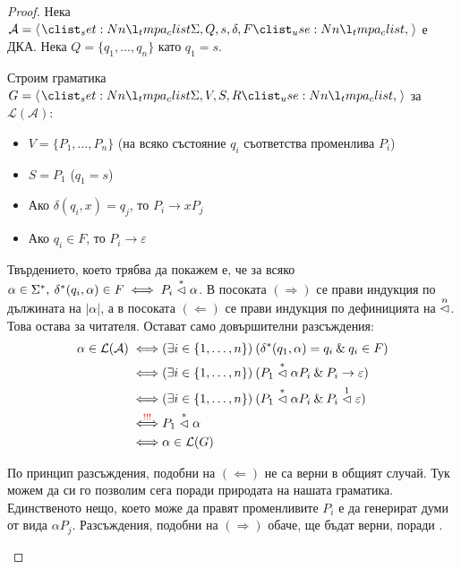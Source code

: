 \begin{proof}
    Нека $\mathcal{A} = \opair{\Sigma, Q, s, \delta, F}$ е ДКА.
    Нека $Q = \{ q_1, \dots, q_n \}$ като $q_1 = s$.

    Строим граматика $G = \opair{\Sigma, V, S, R}$ за $\mathcal{L(A)}$:
    \begin{itemize}
        \item $V = \{ P_1, \dots, P_n \}$ (на всяко състояние $q_i$ съответства променлива $P_i$)
        \item $S = P_1$ ($q_1 = s$)
        \item Ако $\delta(q_i, x) = q_j$, то $P_i \rightarrow x P_j$
        \item Ако $q_i \in F$, то $P_i \rightarrow \varepsilon$
    \end{itemize}

    Твърдението, което трябва да покажем е, че за всяко $\alpha \in \Sigma^*, \: \delta^*(q_i, \alpha) \in F \iff P_i \stackrel{*}{\vartriangleleft} \alpha $.
    В посоката $(\Rightarrow)$ се прави индукция по дължината на $|\alpha|$, а в посоката $(\Leftarrow)$ се прави индукция по дефиницията на $\stackrel{n}{\vartriangleleft}$.
    Това остава за читателя.
    Остават само довършителни разсъждения:
    \begin{align*}
        \alpha \in \mathcal{L(A)}  \iff       & (\exists i \in \{ 1, \dots, n \}) \: (\delta^*(q_1, \alpha) = q_i \: \& \: q_i \in F)              \\
        \iff                                  & (\exists i \in \{ 1, \dots, n \}) \: (P_1 \stackrel{*}{\vartriangleleft} \alpha P_i \: \& \: P_i \rightarrow \varepsilon) \\
        \iff                                  & (\exists i \in \{ 1, \dots, n \}) \: (P_1 \stackrel{*}{\vartriangleleft} \alpha P_i \: \& \: P_i \stackrel{1}{\vartriangleleft} \varepsilon)     \\
        \stackrel{\textcolor{red}{!!!}}{\iff} & P_1 \stackrel{*}{\vartriangleleft} \alpha                                                                                 \\
        \iff                                  & \alpha \in \mathcal{L}(G)
    \end{align*}
    \begin{warning}[\textcolor{red}{!!!}]
        По принцип разсъждения, подобни на $(\Leftarrow)$ не са верни в общият случай.
        Тук можем да си го позволим сега поради природата на нашата граматика.
        Единственото нещо, което може да правят променливите $P_i$ е да генерират думи от вида $\alpha P_j$.
        Разсъждения, подобни на $(\Rightarrow)$ обаче, ще бъдат верни, поради .
    \end{warning}
\end{proof}

